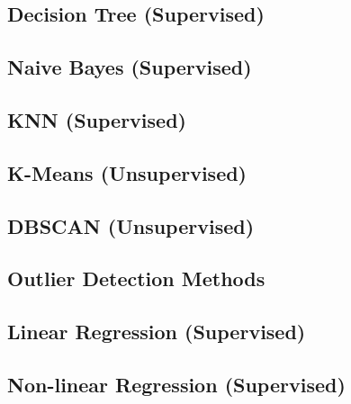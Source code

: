 \documentclass[1pt,letter]{article}
\begin{document}
\begin{minipage}{0.45\textwidth}
    \subsection{Decision Tree (Supervised)}
    \subsection{Naive Bayes (Supervised)}
    \subsection{KNN (Supervised)}
    \subsection{K-Means (Unsupervised)}
    \subsection{DBSCAN (Unsupervised)}
    \subsection{Outlier Detection Methods}
    \subsection{Linear Regression (Supervised)}
    \subsection{Non-linear Regression (Supervised)}
\end{minipage}
\hfill
\end{document}
